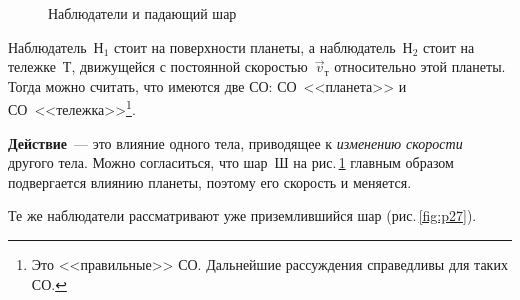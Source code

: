 \documentclass[main.tex]{subfiles}
\begin{document}
\begin{figure}[H]
\caption{Наблюдатели и падающий шар}
\label{fig:p26}
\end{figure}

Наблюдатель~$\text{Н}_1$ стоит на поверхности планеты, а наблюдатель~$\text{Н}_2$ стоит на тележке~Т, движущейся с постоянной скоростью~$\vec v_\text{т}$ относительно этой планеты. Тогда можно считать, что имеются две СО: СО~<<планета>> и СО~<<тележка>>\footnote{Это <<правильные>> СО. Дальнейшие рассуждения справедливы для таких СО.}.   

\textbf{Действие}~--- это влияние одного тела, приводящее к \emph{изменению скорости} другого тела.
Можно согласиться, что шар~Ш на рис.\,\ref{fig:p26} главным образом подвергается влиянию планеты, поэтому его скорость и меняется.


Те же наблюдатели рассматривают уже приземлившийся шар (рис.\,\ref{fig:p27}).
\end{document}
